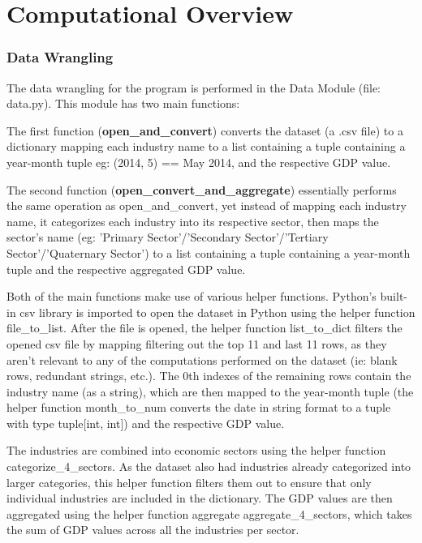 \documentclass[fontsize=11pt]{article}
\begin{document}
\section*{Computational Overview}

\subsubsection*{Data Wrangling}

The data wrangling for the program is performed in the Data Module (file: data.py). This module has two main functions:

\medskip

The first function (\textbf{open\_and\_convert}) converts the dataset (a .csv file) to a dictionary mapping each industry name to a list containing a tuple containing a year-month tuple eg: (2014, 5) == May 2014, and the respective GDP value.

The second function (\textbf{open\_convert\_and\_aggregate}) essentially performs the same operation as open\_and\_convert, yet instead of mapping each industry name, it categorizes each industry into its respective sector, then maps the sector's name (eg: 'Primary Sector'/'Secondary Sector'/'Tertiary Sector'/'Quaternary Sector') to a list containing a tuple containing a year-month tuple and the respective aggregated GDP value.

\medskip

Both of the main functions make use of various helper functions. Python's built-in csv library is imported to open the dataset in Python using the helper function file\_to\_list. After the file is opened, the helper function list\_to\_dict filters the opened csv file by mapping filtering out the top 11 and last 11 rows, as they aren't relevant to any of the computations performed on the dataset (ie: blank rows, redundant strings, etc.). The 0th indexes of the remaining rows contain the industry name (as a string), which are then mapped to the year-month tuple (the helper function month\_to\_num converts the date in string format to a tuple with type tuple[int, int]) and the respective GDP value.


The industries are combined into economic sectors using the helper function categorize\_4\_sectors. As the dataset also had industries already categorized into larger categories, this helper function filters them out to ensure that only individual industries are included in the dictionary. The GDP values are then aggregated using the helper function aggregate aggregate\_4\_sectors, which takes the sum of GDP values across all the industries per sector.
\end{document}
